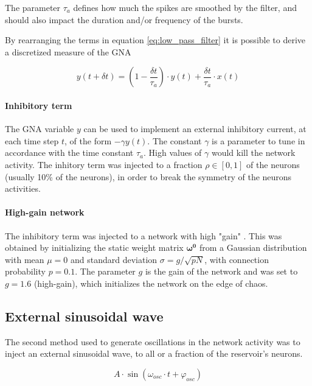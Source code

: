\documentclass[10pt,a4paper, final]{report} %
\begin{document}
The parameter $\tau_a$ defines how much the spikes are smoothed by the filter, and should also impact the duration and/or frequency of the bursts.

By rearranging the terms in equation \eqref{eq:low_pass_filter} it is possible to derive a discretized measure of the GNA

\begin{equation}
y(t+ \delta t) = \left(1 - \frac{\delta t}{\tau_a} \right) \cdot y(t) + \frac{\delta t}{\tau_a} \cdot x(t)
\label{eq:network_activity}
\end{equation}

\paragraph{Inhibitory term}
The GNA variable $y$ can be used to implement an external inhibitory current, at each time step $t$, of the form $- \gamma y(t)$. The constant $\gamma$ is a parameter to tune in accordance with the time constant $\tau_a$. High values of $\gamma$ would kill the network activity. The inhitory term was injected to a fraction $\rho \in [0,1]$ of the neurons (usually 10\% of the neurons), in order to break the symmetry of the neurons activities.

\paragraph{High-gain network}
The inhibitory term was injected to a network with high "gain" \cite{goudar2018encoding}. This was obtained by initializing the static weight matrix $\bm{\omega^0}$ from a Gaussian distribution with mean $\mu = 0$ and standard deviation $\sigma = g / \sqrt{p N}$, with connection probability $p=0.1$. The parameter $g$ is the gain of the network and was set to $g=1.6$ (high-gain), which initializes the network on the edge of chaos.


\subsection{External sinusoidal wave}
The second method used to generate oscillations in the network activity was to inject an external sinusoidal wave, to all or a fraction of the reservoir's neurons.

\begin{equation}
A \cdot \sin (\omega_{osc} \cdot t + \varphi_{osc})
\label{eq:sinusoid}
\end{equation}
\end{document}
